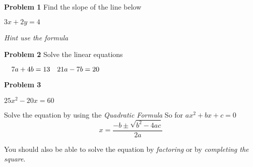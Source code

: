 \documentclass{article}
\begin{document}
\textbf{Problem 1}
Find the slope of the line below

$3x + 2y =4$

\textit{Hint use the formula}


\textbf{Problem 2}
Solve the linear equations


$\\ \quad 7a + 4b = 13\\
 \quad 21a - 7b = 20 $
 
 
 

\textbf{Problem 3}

$ 25x^{2} - 20 x = 60$



Solve the equation by using the \textit{Quadratic Formula}  
So for $ax^{2} + bx + c = 0$
\begin{equation}
x = \frac{-b \pm \sqrt{b^{2}-4ac}}{2a}
\end{equation}


You should also be able to solve the equation by \textit{factoring} or by \textit{completing the square}.
\end{document}
